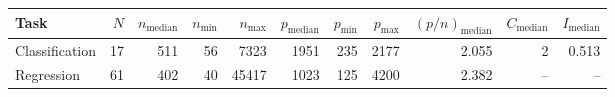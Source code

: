 {\setlength{\tabcolsep}{4pt}
\begin{tabular}{lrrrrrrrrrr}
\toprule
Task & $N$ & $n_\text{median}$ & $n_{\min}$ & $n_{\max}$ & $p_\text{median}$ & $p_{\min}$ & $p_{\max}$ & $\left(p/n\right)_\text{median}$ & $C_\text{median}$ & $I_{\text{median}}$ \\
\midrule
Classification & 17 & 511 & 56 & 7323 & 1951 & 235 & 2177 & 2.055 & 2 & 0.513 \\
Regression & 61 & 402 & 40 & 45417 & 1023 & 125 & 4200 & 2.382 & -- & -- \\
\bottomrule
\end{tabular}}
